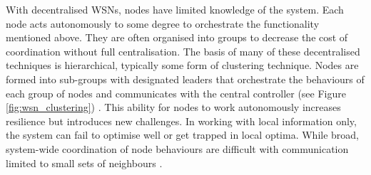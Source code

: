 \ifdefined\DEBUG {} \else \fi
With decentralised WSNs, nodes have limited knowledge of the system. Each node acts autonomously to some degree to orchestrate the functionality mentioned above. They are often organised into groups to decrease the cost of coordination without full centralisation. The basis of many of these decentralised techniques is hierarchical, typically some form of clustering technique. Nodes are formed into sub-groups with designated leaders that orchestrate the behaviours of each group of nodes and communicates with the central controller (see Figure \ref{fig:wsn_clustering}) . This ability for nodes to work autonomously increases resilience but introduces new challenges. In working with local information only, the system can fail to optimise well or get trapped in local optima. While broad, system-wide coordination of node behaviours are difficult with communication limited to small sets of neighbours \citep{Carlos-Mancilla2016}.
